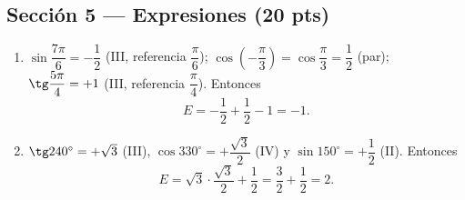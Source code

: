 \documentclass[12pt, letterpaper]{article}
\providecommand{\sen}{\sin}
\begin{document}
\subsection*{Sección 5 — Expresiones (20 pts)}
\begin{enumerate}[leftmargin=*, label=\textbf{\arabic*.}]
  \item $\sen\dfrac{7\pi}{6}=-\dfrac12$ (III, referencia $\dfrac{\pi}{6}$);
        $\cos\!\left(-\dfrac{\pi}{3}\right)=\cos\dfrac{\pi}{3}=\dfrac12$ (par);
        $\tg\dfrac{5\pi}{4}=+1$ (III, referencia $\dfrac{\pi}{4}$). Entonces
        \[
          E=-\frac12+\frac12-1=-1.
        \]
  \item $\tg240^\circ=+\sqrt{3}$ (III), $\cos330^\circ=+\dfrac{\sqrt{3}}{2}$ (IV)
        y $\sen150^\circ=+\dfrac12$ (II). Entonces
        \[
          E=\sqrt{3}\cdot\frac{\sqrt{3}}{2}+\frac12
          =\frac32+\frac12=2.
        \]
\end{enumerate}

\fi
\end{document}

